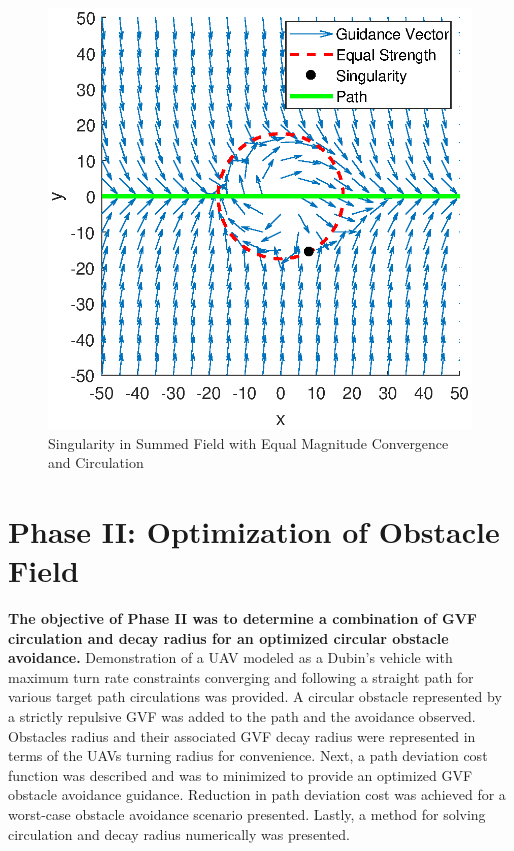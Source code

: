 \documentclass[numbered,pdftex]{ohio-etd}
\begin{document}
\begin{figure}
	\centering
	\includegraphics[width=12cm]{PaperFigures/Methods/summedFieldsCircSingularity}
	\caption{Singularity in Summed Field with Equal Magnitude Convergence and Circulation}
	\label{fig:summedfieldscircsingularity}
\end{figure}



\section{Phase II: Optimization of Obstacle Field}
\textbf{The objective of Phase II was to determine a combination of GVF circulation and decay radius for an optimized circular obstacle avoidance.} Demonstration of a UAV modeled as a Dubin's vehicle with maximum turn rate constraints converging and following a straight path for various target path circulations was provided. A circular obstacle represented by a strictly repulsive GVF was added to the path and the avoidance observed. Obstacles radius and their associated GVF decay radius were represented in terms of the UAVs turning radius for convenience. Next, a path deviation cost function was described and was to minimized to provide an optimized GVF obstacle avoidance guidance. Reduction in path deviation cost was achieved for a worst-case obstacle avoidance scenario presented. Lastly, a method for solving circulation and decay radius numerically was presented. 
\end{document}
